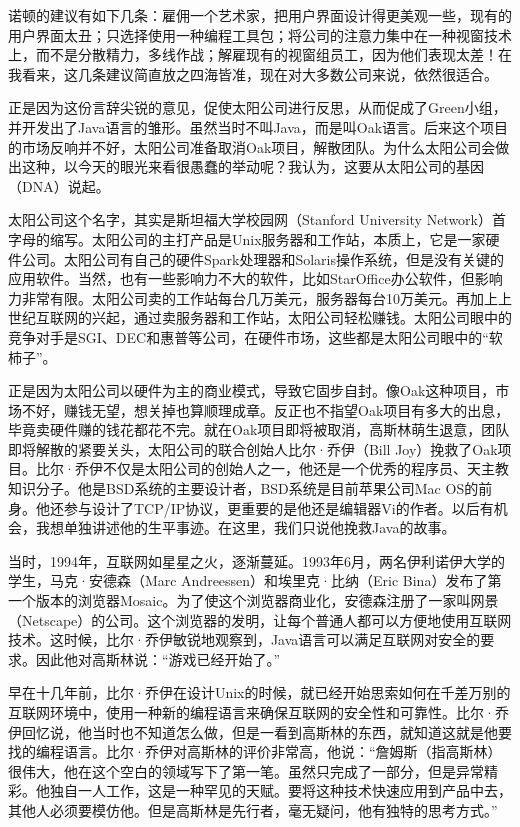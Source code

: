 \documentclass[
  letterpaper,
  DIV=11,
  numbers=noendperiod]{scrreprt}
\begin{document}
诺顿的建议有如下几条：雇佣一个艺术家，把用户界面设计得更美观一些，现有的用户界面太丑；只选择使用一种编程工具包；将公司的注意力集中在一种视窗技术上，而不是分散精力，多线作战；解雇现有的视窗组员工，因为他们表现太差！在我看来，这几条建议简直放之四海皆准，现在对大多数公司来说，依然很适合。

正是因为这份言辞尖锐的意见，促使太阳公司进行反思，从而促成了Green小组，并开发出了Java语言的雏形。虽然当时不叫Java，而是叫Oak语言。后来这个项目的市场反响并不好，太阳公司准备取消Oak项目，解散团队。为什么太阳公司会做出这种，以今天的眼光来看很愚蠢的举动呢？我认为，这要从太阳公司的基因（DNA）说起。

太阳公司这个名字，其实是斯坦福大学校园网（Stanford University
Network）首字母的缩写。太阳公司的主打产品是Unix服务器和工作站，本质上，它是一家硬件公司。太阳公司有自己的硬件Spark处理器和Solaris操作系统，但是没有关键的应用软件。当然，也有一些影响力不大的软件，比如StarOffice办公软件，但影响力非常有限。太阳公司卖的工作站每台几万美元，服务器每台10万美元。再加上上世纪互联网的兴起，通过卖服务器和工作站，太阳公司轻松赚钱。太阳公司眼中的竞争对手是SGI、DEC和惠普等公司，在硬件市场，这些都是太阳公司眼中的``软柿子''。

正是因为太阳公司以硬件为主的商业模式，导致它固步自封。像Oak这种项目，市场不好，赚钱无望，想关掉也算顺理成章。反正也不指望Oak项目有多大的出息，毕竟卖硬件赚的钱花都花不完。就在Oak项目即将被取消，高斯林萌生退意，团队即将解散的紧要关头，太阳公司的联合创始人比尔·乔伊（Bill
Joy）挽救了Oak项目。比尔·乔伊不仅是太阳公司的创始人之一，他还是一个优秀的程序员、天主教知识分子。他是BSD系统的主要设计者，BSD系统是目前苹果公司Mac
OS的前身。他还参与设计了TCP/IP协议，更重要的是他还是编辑器Vi的作者。以后有机会，我想单独讲述他的生平事迹。在这里，我们只说他挽救Java的故事。

当时，1994年，互联网如星星之火，逐渐蔓延。1993年6月，两名伊利诺伊大学的学生，马克·安德森（Marc
Andreessen）和埃里克·比纳（Eric
Bina）发布了第一个版本的浏览器Mosaic。为了使这个浏览器商业化，安德森注册了一家叫网景（Netscape）的公司。这个浏览器的发明，让每个普通人都可以方便地使用互联网技术。这时候，比尔·乔伊敏锐地观察到，Java语言可以满足互联网对安全的要求。因此他对高斯林说：``游戏已经开始了。''

早在十几年前，比尔·乔伊在设计Unix的时候，就已经开始思索如何在千差万别的互联网环境中，使用一种新的编程语言来确保互联网的安全性和可靠性。比尔·乔伊回忆说，他当时也不知道怎么做，但是一看到高斯林的东西，就知道这就是他要找的编程语言。比尔·乔伊对高斯林的评价非常高，他说：``詹姆斯（指高斯林）很伟大，他在这个空白的领域写下了第一笔。虽然只完成了一部分，但是异常精彩。他独自一人工作，这是一种罕见的天赋。要将这种技术快速应用到产品中去，其他人必须要模仿他。但是高斯林是先行者，毫无疑问，他有独特的思考方式。''
\end{document}
